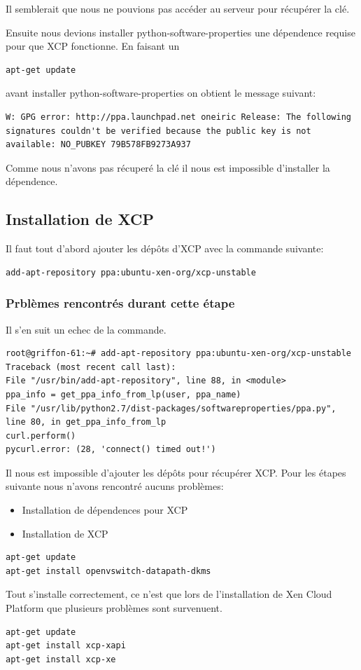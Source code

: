 Il semblerait que nous ne pouvions pas accéder au serveur pour récupérer la clé.

Ensuite nous devions installer python-software-properties une dépendence requise pour que XCP fonctionne.
En faisant un
\begin{lstlisting} 
apt-get update
\end{lstlisting}
avant installer python-software-properties on obtient le message suivant:

\begin{lstlisting}
W: GPG error: http://ppa.launchpad.net oneiric Release: The following signatures couldn't be verified because the public key is not available: NO_PUBKEY 79B578FB9273A937
\end{lstlisting}

Comme nous n'avons pas récuperé la clé il nous est impossible d'installer la dépendence.

\subsection{Installation de XCP}

Il faut tout d'abord ajouter les dépôts d'XCP avec la commande suivante:
\begin{lstlisting}
add-apt-repository ppa:ubuntu-xen-org/xcp-unstable
\end{lstlisting}

\subsubsection{Prblèmes rencontrés durant cette étape}
Il s'en suit un echec de la commande.
\begin{lstlisting}  
root@griffon-61:~# add-apt-repository ppa:ubuntu-xen-org/xcp-unstable
Traceback (most recent call last):
File "/usr/bin/add-apt-repository", line 88, in <module>
ppa_info = get_ppa_info_from_lp(user, ppa_name)
File "/usr/lib/python2.7/dist-packages/softwareproperties/ppa.py", line 80, in get_ppa_info_from_lp
curl.perform()
pycurl.error: (28, 'connect() timed out!')
\end{lstlisting}
Il nous est impossible d'ajouter les dépôts pour récupérer XCP.
Pour les étapes suivante nous n'avons rencontré aucuns problèmes:
\begin{itemize}
\item Installation de dépendences pour XCP
\item Installation de XCP
\end{itemize}
\begin{lstlisting}
apt-get update
apt-get install openvswitch-datapath-dkms
\end{lstlisting}
Tout s'installe correctement, ce n'est que lors de l'installation de Xen Cloud Platform que plusieurs problèmes sont survenuent.
\begin{lstlisting}
apt-get update
apt-get install xcp-xapi
apt-get install xcp-xe
\end{lstlisting}


